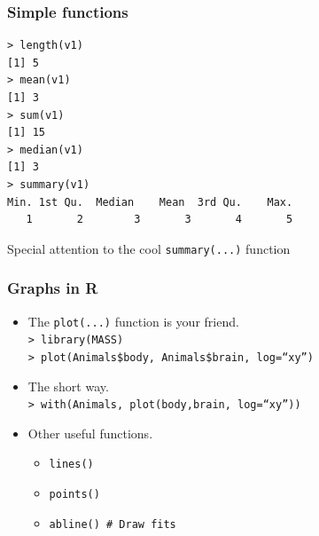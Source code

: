 \documentclass{beamer}
\begin{document}

\begin{frame}[fragile]

 \frametitle{Simple functions}
 \begin{verbatim}
> length(v1)
[1] 5
> mean(v1)
[1] 3
> sum(v1)
[1] 15
> median(v1)
[1] 3
> summary(v1)
Min. 1st Qu.  Median    Mean  3rd Qu.    Max. 
   1       2        3       3       4       5
 \end{verbatim}
 \vspace{-0.9cm}
 Special attention to the cool \texttt{summary(...)} function

\end{frame}


\begin{frame}[fragile]

 \frametitle{Graphs in R}
 \begin{itemize}
  \item The \texttt{plot(...)} function is your friend.\\
  \texttt{> library(MASS)}\\
  \texttt{> plot(Animals\$body, Animals\$brain, log=``xy'')}
  \item The short way.\\
  \texttt{> with(Animals, plot(body,brain, log=``xy''))}
  \item Other useful functions.
  \begin{itemize}
   \item \texttt{lines()}
   \item \texttt{points()}
   \item \texttt{abline() \# Draw fits}
  
  \end{itemize}
  \end{itemize}

\end{frame}

\end{document}
